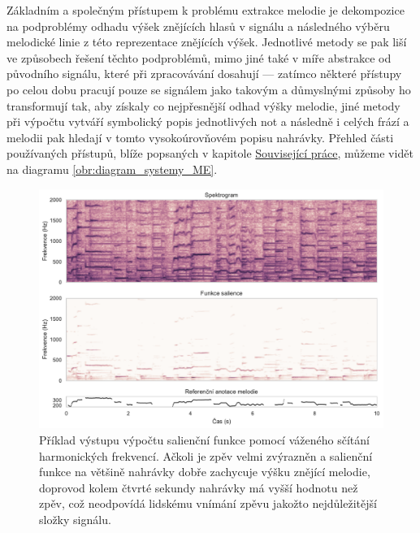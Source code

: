 Základním a společným přístupem k problému extrakce melodie je dekompozice na podproblémy odhadu výšek znějících hlasů v signálu a následného výběru melodické linie z této reprezentace znějících výšek. Jednotlivé metody se pak liší ve způsobech řešení těchto podproblémů, mimo jiné také v míře abstrakce od původního signálu, které při zpracovávání dosahují --- zatímco některé přístupy po celou dobu pracují pouze se signálem jako takovým a důmyslnými způsoby ho transformují tak, aby získaly co nejpřesnější odhad výšky melodie, jiné metody při výpočtu vytváří symbolický popis jednotlivých not a následně i celých frází a melodii pak hledají v tomto vysokoúrovňovém popisu nahrávky. Přehled části používaných přístupů, blíže popsaných v kapitole \hyperref[chap:souvisejici]{Související práce}, můžeme vidět na diagramu \ref{obr:diagram_systemy_ME}.

\begin{figure}[h]\centering
\includegraphics[width=\textwidth,height=\textheight,keepaspectratio]{../img/salience}
\caption{Příklad výstupu výpočtu salienční funkce pomocí váženého sčítání harmonických frekvencí. Ačkoli je zpěv velmi zvýrazněn a salienční funkce na většině nahrávky dobře zachycuje výšku znějící melodie, doprovod kolem čtvrté sekundy nahrávky má vyšší hodnotu než zpěv, což neodpovídá lidskému vnímání zpěvu jakožto nejdůležitější složky signálu.}
\label{obr:salience}
\end{figure}

